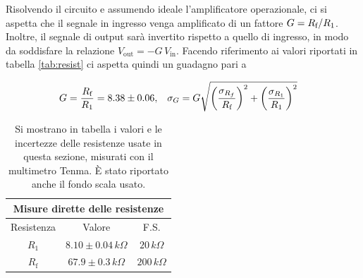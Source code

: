 \documentclass[a4paper,11pt]{article}
\begin{document}
\noindent Risolvendo il circuito e assumendo ideale l'amplificatore operazionale, ci si aspetta che
il segnale in ingresso venga amplificato di un fattore $G = R_{\text f}/R_{1}$.
Inoltre, il segnale di output sarà invertito rispetto a quello di ingresso, in modo
da soddisfare la relazione $V_{\text{out}}=-G\, V_{\text{in}}$. Facendo riferimento ai valori riportati
in tabella \autoref{tab:resist} ci aspetta quindi un guadagno pari a

\begin{align}\label{e:guadagno}
  G &= \frac{R_{\text f}}{R_{1}} = 8.38 \pm 0.06,
  &
  \sigma_{G} &= G \sqrt{ \left( \frac{\sigma_{R_f}}{R_{\text{f}}} \right)^{2}  +
			\left( \frac{ \sigma_{R_{1}}}{R_{1}} \right)^{2}}
\end{align}

\renewcommand{\arraystretch}{1.1}
\begin{table}
\centering
\setlength{\tabcolsep}{10pt}
\begin{tabular}{ |c|c|c|  }
\hline
\multicolumn{3}{|c|}{Misure dirette delle resistenze} \\
\hline
Resistenza      & Valore & F.S.\\
\hline
$R_{1}$ & $8.10 \pm 0.04\,\si{k\Omega}$ &$20\,\si{k\Omega}$ \\
$R_{\text{f}}$ & $67.9 \pm 0.3\,\si{k\Omega}$ &$200\,\si{k\Omega}$ \\
\hline
\end{tabular}
\caption{\footnotesize Si mostrano in tabella i valori e le incertezze delle resistenze usate in questa sezione, misurati con il multimetro Tenma. È stato riportato anche il fondo scala usato.}
\label{tab:resist}
\end{table}
\end{document}
